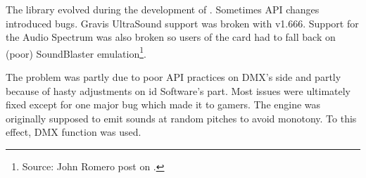 The library evolved during the development of \doom. Sometimes API changes introduced bugs. Gravis UltraSound support was broken with v1.666. Support for the Audio Spectrum was also broken so users of the card had to fall back on (poor) SoundBlaster emulation\footnote{Source: John Romero post on .}.\\
\par
The problem was partly due to poor API practices on DMX's side and partly because of hasty adjustments on id Software's part. Most issues were ultimately fixed except for one major bug which made it to gamers. The engine was originally supposed to emit sounds at random pitches to avoid monotony. To this effect, DMX function  was used.\\
\par
{}





